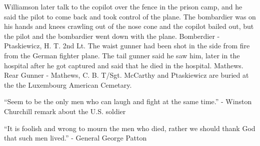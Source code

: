 \documentclass{article}
\begin{document}
\begin{multicols}{3}
Williamson later talk to the copilot over the fence in the prison camp, and he said the pilot to come back and took control of the plane. The bombardier was on his hands and knees crawling out of the nose cone and the copilot bailed out, but the pilot and the bombardier went down with the plane. Bomberdier - Ptaskiewicz, H. T. 2nd Lt.
The waist gunner had been shot in the side from fire from the German fighter plane. The tail gunner said he saw him, later in the hospital after he got captured and said that he died in the hospital. Mathews. Rear Gunner - Mathews, C. B. T/Sgt. McCarthy and Ptaskiewicz are buried at the the Luxembourg American Cemetary.

\closearticle


``Seem to be the only men who can laugh and fight at the same time.'' - Winston Churchill remark about the U.S. soldier

``It is foolish and wrong to mourn the men who died, rather we should thank God that such men lived.'' - General George Patton



\end{multicols}
\end{document}
